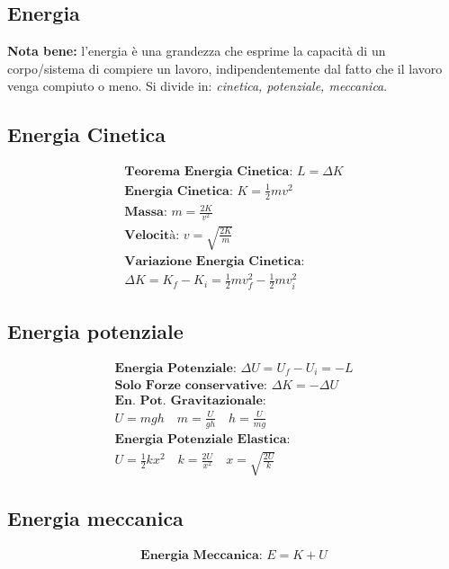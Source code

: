 \subsection{Energia}
\textbf{Nota bene: } l'energia è una grandezza che esprime la capacità di un corpo/sistema di compiere un lavoro, indipendentemente dal fatto che il lavoro venga compiuto o meno. Si divide in: \textit{cinetica, potenziale, meccanica}.

\subsection{Energia Cinetica}

\begin{gather*}
    \textbf{Teorema Energia Cinetica: } L = \Delta K \\
    \textbf{Energia Cinetica: } K = \frac{1}{2} m v^2 \\
    \textbf{Massa: } m = \frac{2K}{v^2} \\
    \textbf{Velocità: } v = \sqrt{\frac{2K}{m}} \\
    \textbf{Variazione Energia Cinetica: } \\ \Delta K = K_f - K_i = \frac{1}{2} m v_f^2 - \frac{1}{2} m v_i^2
\end{gather*}

\subsection{Energia potenziale}

\begin{gather*}
    \textbf{Energia Potenziale: } \Delta U = U_f - U_i = -L \\
    \textbf{Solo Forze conservative: } \Delta K = - \Delta U \\ 
    \textbf{En. Pot. Gravitazionale: } \\
        U = m g h \quad
        m = \frac{U}{gh} \quad
        h = \frac{U}{mg} \\
    \textbf{Energia Potenziale Elastica: } \\
        U = \frac{1}{2} k x^2 \quad
        k = \frac{2U}{x^2} \quad
        x = \sqrt{\frac{2U}{k}}
\end{gather*}

\subsection{Energia meccanica}

\begin{gather*}
    \textbf{Energia Meccanica: } E = K + U \\
\end{gather*}

